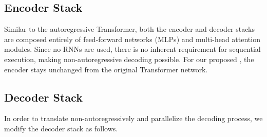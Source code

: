 \subsection{Encoder Stack}
Similar to the autoregressive Transformer, both the encoder and decoder stacks are composed entirely of feed-forward networks (MLPs) and multi-head attention modules. Since no RNNs are used, there is no inherent requirement for sequential execution, making non-autoregressive decoding possible.
For our proposed \model{}, the encoder stays unchanged from the original Transformer network.

\subsection{Decoder Stack}\label{sec:decoderStack}
In order to translate non-autoregressively and parallelize the decoding process, we modify the decoder stack as follows.

\vspace{-5pt}
